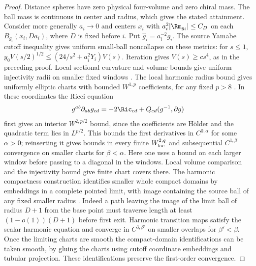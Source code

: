 \begin{proof}
Distance spheres have zero physical four-volume and zero chiral
mass. The ball mass is continuous in center and radius, which
gives the stated attainment. Consider more generally \(a_i\to0\)
and centers \(x_i\) with \(a_i^2|\Rm_{g_i}|\le C_D\) on each
\(B_{g_i}(x_i,Da_i)\), where \(D\) is fixed before \(i\).
Put \(\widehat g_i=a_i^{-2}g_i\). The source Yamabe cutoff inequality
gives uniform small-ball noncollapse on these metrics:
for \(s\le1\), \(y_0 V(s/2)^{1/2}\le(24/s^2+a_i^2Y_i)V(s)\).
Iteration gives \(V(s)\ge cs^4\), as in the preceding proof.
Local sectional curvature and volume bounds give uniform injectivity
radii on smaller fixed windows \cite[\S4]{CheegerGromovTaylor1982}.
The local harmonic radius bound gives uniformly elliptic charts with bounded \(W^{1,p}\) coefficients, for any fixed \(p>8\) \cite[Theorem 0.3]{AndersonCheeger1992Harmonic}. In these coordinates the Ricci equation
\[
 g^{ab}\partial_{ab}g_{cd}=-2\Ric_{cd}+Q_{cd}(g^{-1},\partial g)
\]
first gives an interior \(W^{2,p/2}\) bound, since the coefficients are H\"older and the quadratic term lies in \(L^{p/2}\). This bounds the first derivatives in \(C^{0,\alpha}\) for some \(\alpha>0\); reinserting it gives bounds in every finite \(W^{2,q}_{\rm loc}\) and subsequential \(C^{1,\beta}\) convergence on smaller charts for \(\beta<\alpha\).
Here one uses a bound on each larger window before passing to
a diagonal in the windows. Local volume comparison and the
injectivity bound give finite chart covers there. The harmonic
compactness construction identifies smaller whole compact domains
by embeddings in a complete pointed limit, with image containing the source ball of any fixed smaller radius \cite[Theorem 3.1 and its proof]{BelegradekKapovitch2000Finiteness}.
Indeed a path leaving the image of the limit ball of radius \(D+1\)
from the base point must traverse length at least \((1-o(1))(D+1)\)
before first exit. Harmonic transition maps satisfy the scalar
harmonic equation and converge in \(C^{3,\beta'}\) on smaller
overlaps for \(\beta'<\beta\). Once the limiting charts are smooth
the compact-domain identifications can be taken smooth, by gluing
the charts using cutoff coordinate embeddings and tubular projection.
These identifications preserve the first-order convergence.


\end{proof}
